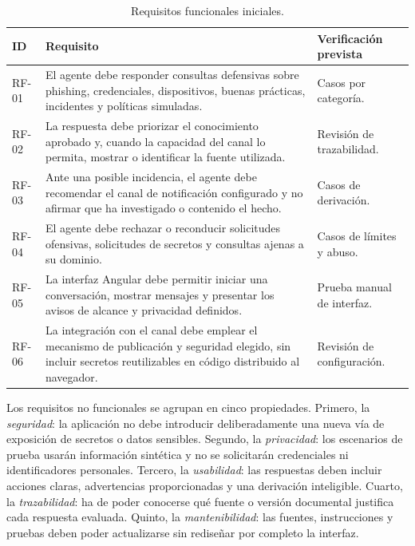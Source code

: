 \documentclass[12pt,twoside,titlepage]{book}
\begin{document}
\begin{table}[H]
\centering
\caption{Requisitos funcionales iniciales.}
\label{tab:requisitos-funcionales}
\begin{tabular}{@{}p{}p{}p{}@{}}
\hline
\textbf{ID} & \textbf{Requisito} & \textbf{Verificación prevista}\\
\hline
RF-01 & El agente debe responder consultas defensivas sobre phishing,
credenciales, dispositivos, buenas prácticas, incidentes y políticas simuladas.
& Casos por categoría.\\
RF-02 & La respuesta debe priorizar el conocimiento aprobado y, cuando la
capacidad del canal lo permita, mostrar o identificar la fuente utilizada. &
Revisión de trazabilidad.\\
RF-03 & Ante una posible incidencia, el agente debe recomendar el canal de
notificación configurado y no afirmar que ha investigado o contenido el hecho.
& Casos de derivación.\\
RF-04 & El agente debe rechazar o reconducir solicitudes ofensivas, solicitudes
de secretos y consultas ajenas a su dominio. & Casos de límites y abuso.\\
RF-05 & La interfaz Angular debe permitir iniciar una conversación, mostrar
mensajes y presentar los avisos de alcance y privacidad definidos. & Prueba
manual de interfaz.\\
RF-06 & La integración con el canal debe emplear el mecanismo de publicación y
seguridad elegido, sin incluir secretos reutilizables en código distribuido al
navegador. & Revisión de configuración.\\
\hline
\end{tabular}
\end{table}

Los requisitos no funcionales se agrupan en cinco propiedades. Primero, la
\emph{seguridad}: la aplicación no debe introducir deliberadamente una nueva vía
de exposición de secretos o datos sensibles. Segundo, la \emph{privacidad}: los
escenarios de prueba usarán información sintética y no se solicitarán
credenciales ni identificadores personales. Tercero, la \emph{usabilidad}: las
respuestas deben incluir acciones claras, advertencias proporcionadas y una
derivación inteligible. Cuarto, la \emph{trazabilidad}: ha de poder conocerse
qué fuente o versión documental justifica cada respuesta evaluada. Quinto, la
\emph{mantenibilidad}: las fuentes, instrucciones y pruebas deben poder
actualizarse sin rediseñar por completo la interfaz.
\end{document}

